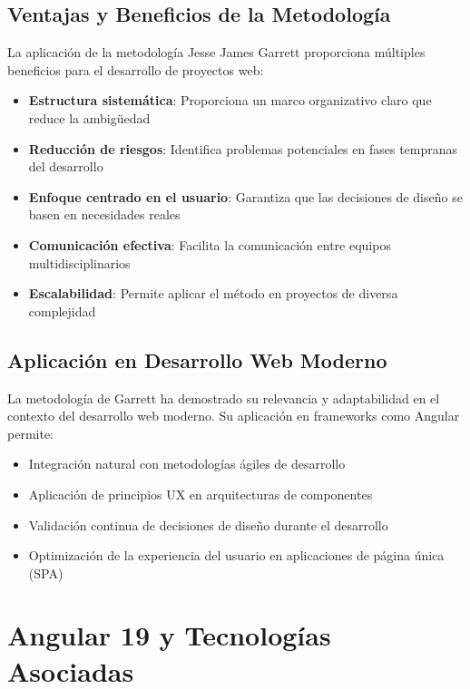 \subsection{Ventajas y Beneficios de la Metodología}

La aplicación de la metodología Jesse James Garrett proporciona múltiples beneficios para el desarrollo de proyectos web:

\begin{itemize}
    \item \textbf{Estructura sistemática}: Proporciona un marco organizativo claro que reduce la ambigüedad
    \item \textbf{Reducción de riesgos}: Identifica problemas potenciales en fases tempranas del desarrollo
    \item \textbf{Enfoque centrado en el usuario}: Garantiza que las decisiones de diseño se basen en necesidades reales
    \item \textbf{Comunicación efectiva}: Facilita la comunicación entre equipos multidisciplinarios
    \item \textbf{Escalabilidad}: Permite aplicar el método en proyectos de diversa complejidad
\end{itemize}

\subsection{Aplicación en Desarrollo Web Moderno}

La metodología de Garrett ha demostrado su relevancia y adaptabilidad en el contexto del desarrollo web moderno. Su aplicación en frameworks como Angular permite:

\begin{itemize}
    \item Integración natural con metodologías ágiles de desarrollo
    \item Aplicación de principios UX en arquitecturas de componentes
    \item Validación continua de decisiones de diseño durante el desarrollo
    \item Optimización de la experiencia del usuario en aplicaciones de página única (SPA)
\end{itemize}

\section{Angular 19 y Tecnologías Asociadas}

